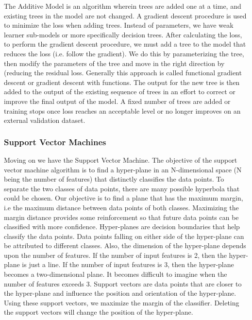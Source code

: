 \documentclass[12pt]{article}
\begin{document}
The Additive Model is an algorithm wherein trees are added one at a time, and existing trees in the model are not changed. A gradient descent procedure is used to minimize the loss when adding trees.  Instead of parameters, we have weak learner sub-models or more specifically decision trees. After calculating the loss, to perform the gradient descent procedure, we must add a tree to the model that reduces the loss (i.e. follow the gradient). We do this by parameterizing the tree, then modify the parameters of the tree and move in the right direction by (reducing the residual loss. Generally this approach is called functional gradient descent or gradient descent with functions. The output for the new tree is then added to the output of the existing sequence of trees in an effort to correct or improve the final output of the model. A fixed number of trees are added or training stops once loss reaches an acceptable level or no longer improves on an external validation dataset.


\subsubsection{Support Vector Machines}
Moving on we have the Support Vector Machine. The objective of the support vector machine algorithm is to find a hyper-plane in an N-dimensional space (N being the number of features) that distinctly classifies the data points. To separate the two classes of data points, there are many possible hyperbola that could be chosen. Our objective is to find a plane that has the maximum margin, i.e the maximum distance between data points of both classes. Maximizing the margin distance provides some reinforcement so that future data points can be classified with more confidence. Hyper-planes are decision boundaries that help classify the data points. Data points falling on either side of the hyper-plane can be attributed to different classes. Also, the dimension of the hyper-plane depends upon the number of features. If the number of input features is 2, then the hyper-plane is just a line. If the number of input features is 3, then the hyper-plane becomes a two-dimensional plane. It becomes difficult to imagine when the number of features exceeds 3. Support vectors are data points that are closer to the hyper-plane and influence the position and orientation of the hyper-plane. Using these support vectors, we maximize the margin of the classifier. Deleting the support vectors will change the position of the hyper-plane.
\end{document}
